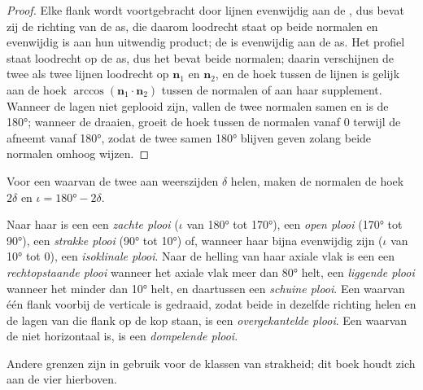 \begin{proof}
Elke flank wordt voortgebracht door lijnen evenwijdig aan de , dus bevat zij de richting van de as, die daarom loodrecht staat op beide normalen en evenwijdig is aan hun uitwendig product; de  is evenwijdig aan de as. Het profiel staat loodrecht op de as, dus het bevat beide normalen; daarin verschijnen de twee  als twee lijnen loodrecht op $\mathbf n_1$ en $\mathbf n_2$, en de hoek tussen de lijnen is gelijk aan de hoek $\arccos(\mathbf n_1\cdot\mathbf n_2)$ tussen de normalen of aan haar supplement. Wanneer de lagen niet geplooid zijn, vallen de twee normalen samen en is de  \ang{180}; wanneer de  draaien, groeit de hoek tussen de normalen vanaf $0$ terwijl de  afneemt vanaf \ang{180}, zodat de twee samen \ang{180} blijven geven zolang beide normalen omhoog wijzen.
\end{proof}

Voor een  waarvan de twee  aan weerszijden $\delta$ helen, maken de normalen de hoek $2\delta$ en $\iota = \ang{180} - 2\delta$.

\begin{definition}\label{def:b1:faults-folds-fabrics:fold-classes}
Naar haar  is een  een \emph{zachte plooi} ($\iota$ van \ang{180} tot \ang{170}), een \emph{open plooi} (\ang{170} tot \ang{90}), een \emph{strakke plooi} (\ang{90} tot \ang{10}) of, wanneer haar  bijna evenwijdig zijn ($\iota$ van \ang{10} tot $0$), een \emph{isoklinale plooi}. Naar de helling van haar axiale vlak is een  een \emph{rechtopstaande plooi} wanneer het axiale vlak meer dan \ang{80} helt, een \emph{liggende plooi} wanneer het minder dan \ang{10} helt, en daartussen een \emph{schuine plooi}. Een  waarvan één flank voorbij de verticale is gedraaid, zodat beide  in dezelfde richting helen en de lagen van die flank op de kop staan, is een \emph{overgekantelde plooi}. Een  waarvan de  niet horizontaal is, is een \emph{dompelende plooi}.
\end{definition}
Andere grenzen zijn in gebruik voor de klassen van strakheid; dit boek houdt zich aan de vier hierboven.

